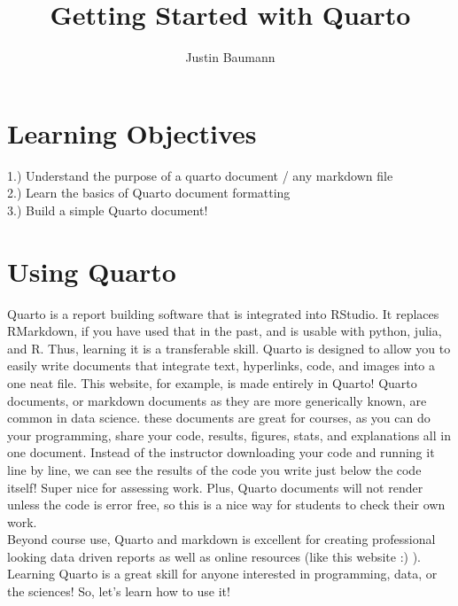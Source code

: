\documentclass[
  letterpaper,
  DIV=11,
  numbers=noendperiod]{scrartcl}
\title{Getting Started with Quarto}
\author{Justin Baumann}
\date{}
\renewcommand*\contentsname{Table of contents}
\newcommand\contentsname{Table of contents}
\begin{document}
\maketitle
\ifdefined\Shaded\renewenvironment{Shaded}{\begin{tcolorbox}[enhanced, frame hidden, borderline west={3pt}{0pt}{shadecolor}, breakable, interior hidden, boxrule=0pt, sharp corners]}{\end{tcolorbox}}\fi

\renewcommand*\contentsname{Table of contents}
{
\hypersetup{linkcolor=}
\setcounter{tocdepth}{3}
\tableofcontents
}
\hypertarget{learning-objectives}{%
\section{\texorpdfstring{\textbf{Learning
Objectives}}{Learning Objectives}}\label{learning-objectives}}

1.) Understand the purpose of a quarto document / any markdown file\\

2.) Learn the basics of Quarto document formatting\\

3.) Build a simple Quarto document!\\

\hypertarget{using-quarto}{%
\section{\texorpdfstring{\textbf{Using
Quarto}}{Using Quarto}}\label{using-quarto}}

Quarto is a report building software that is integrated into RStudio. It
replaces RMarkdown, if you have used that in the past, and is usable
with python, julia, and R. Thus, learning it is a transferable skill.
Quarto is designed to allow you to easily write documents that integrate
text, hyperlinks, code, and images into a one neat file. This website,
for example, is made entirely in Quarto! Quarto documents, or markdown
documents as they are more generically known, are common in data
science. these documents are great for courses, as you can do your
programming, share your code, results, figures, stats, and explanations
all in one document. Instead of the instructor downloading your code and
running it line by line, we can see the results of the code you write
just below the code itself! Super nice for assessing work. Plus, Quarto
documents will not render unless the code is error free, so this is a
nice way for students to check their own work.\\
Beyond course use, Quarto and markdown is excellent for creating
professional looking data driven reports as well as online resources
(like this website :) ). Learning Quarto is a great skill for anyone
interested in programming, data, or the sciences! So, let's learn how to
use it!\\
\end{document}
